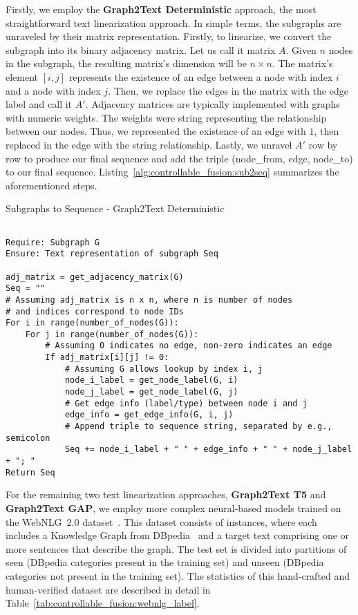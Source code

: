 Firstly, we employ the \textbf{Graph2Text Deterministic} approach, the most straightforward text linearization approach. In simple terms, the subgraphs are unraveled by their matrix representation. Firstly, to linearize, we convert the subgraph into its binary adjacency matrix. Let us call it matrix $A$. 
Given $n$ nodes in the subgraph, the resulting matrix's dimension will be $n \times n$. The matrix's element $[i, j]$ represents the existence of an edge between a node with index $i$ and a node with index $j$. Then, we replace the edges in the matrix with the edge label and call it $A'$. 
Adjacency matrices are typically implemented with graphs with numeric weights. The weights were string representing the relationship between our nodes. Thus, we represented the existence of an edge with $1$, then replaced in the edge with the string relationship.
Lastly, we unravel $A'$ row by row to produce our final sequence and add the triple (node\_from, edge, node\_to) to our final sequence. Listing~\ref{alg:controllable_fusion:sub2seq} summarizes the aforementioned steps. 

\begin{ListingEnv}[p]
    \centering %
    \caption{Subgraphs to Sequence - Graph2Text Deterministic} 
    \label{alg:controllable_fusion:sub2seq} 
    \begin{lstlisting}[basicstyle=\fontsize{10pt}{12pt}\selectfont\ttfamily] % Smaller font for code

Require: Subgraph G
Ensure: Text representation of subgraph Seq

adj_matrix = get_adjacency_matrix(G)
Seq = ""
# Assuming adj_matrix is n x n, where n is number of nodes
# and indices correspond to node IDs
For i in range(number_of_nodes(G)): 
    For j in range(number_of_nodes(G)):
        # Assuming 0 indicates no edge, non-zero indicates an edge
        If adj_matrix[i][j] != 0: 
            # Assuming G allows lookup by index i, j
            node_i_label = get_node_label(G, i) 
            node_j_label = get_node_label(G, j)
            # Get edge info (label/type) between node i and j
            edge_info = get_edge_info(G, i, j) 
            # Append triple to sequence string, separated by e.g., semicolon
            Seq += node_i_label + " " + edge_info + " " + node_j_label + "; " 
Return Seq
    \end{lstlisting}
\end{ListingEnv}

For the remaining two text linearization approaches, \textbf{Graph2Text T5} and \textbf{Graph2Text GAP}, we employ more complex neural-based models trained on the WebNLG~2.0 dataset~\cite{DBLP:conf/acl/GardentSNP17}. This dataset consists of instances, where each includes a Knowledge Graph from DBpedia~\cite{DBLP:conf/semweb/AuerBKLCI07} and a target text comprising one or more sentences that describe the graph. The test set is divided into partitions of seen (DBpedia categories present in the training set) and unseen (DBpedia categories not present in the training set). The statistics of this hand-crafted and human-verified dataset are described in detail in Table~\ref{tab:controllable_fusion:webnlg_label}. 


